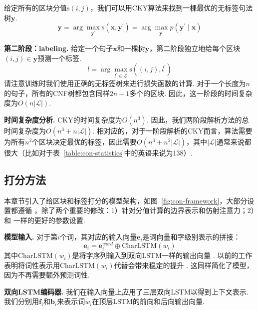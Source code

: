给定所有的区块分值$\mathrm{s}(i,j)$，我们可以用CKY算法来找到一棵最优的无标签句法树$\boldsymbol{y}$.
\begin{equation} \label{eq:tree-argmax}
  \boldsymbol{y} = \arg\max_{\boldsymbol{y}^{\prime}} \mathrm{s}(\boldsymbol{x}, \boldsymbol{y}^{\prime}) = \arg\max_{\boldsymbol{y}^{\prime}} p(\boldsymbol{y}^{\prime} \mid \boldsymbol{x})
\end{equation}

\noindent\textbf{第二阶段：labeling.}
给定一个句子$\boldsymbol{x}$和一棵树$\boldsymbol{y}$，第二阶段独立地给每个区块$(i,j) \in \boldsymbol{y}$预测一个标签.
\begin{equation} \label{eq:label-argmax}
  l = \arg\max_{l^{\prime} \in \mathcal{L}} \mathrm{s}((i,j),l^{\prime})
\end{equation}
请注意训练时我们使用正确的无标签树来进行损失函数的计算.
对于一个长度为$n$的句子，所有的CNF树都包含同样$2n-1$多个的区块.
因此，这一阶段的时间复杂度为$O(n|\mathcal{L}|)$.

\noindent\textbf{时间复杂度分析.}
CKY的时间复杂度为$O(n^3)$.
因此，我们两阶段解析方法的总时间复杂度为$O(n^3+n|\mathcal{L}|)$.
相对应的，对于一阶段解析的CKY而言，算法需要为所有$n^2$个区块决定最优的标签，因此需要$O(n^3+n^2|\mathcal{L}|)$，其中$|\mathcal{L}|$通常来说都很大（比如对于表~\ref{table:con-statistics}中的英语来说为138）.

\subsection{打分方法}

本章节引入了给区块和标签打分的模型架构，如图~\ref{fig:con-framework}，大部分设置都遵循 \citep{stern-etal-2017-minimal}，除了两个重要的修改：1）针对分值计算的边界表示和仿射注意力；2）和 \citep{dozat-etal-2017-biaffine}一样的更好的参数设置.

\noindent\textbf{模型输入.}
对于第$i$个词，其对应的输入向量$\mathbf{e}_i$是词向量和字级别表示的拼接：
\begin{equation} \label{eq:token-representation}
  \mathbf{e}_i = \mathbf{e}^{word}_i \oplus \mathrm{CharLSTM}(w_i)
\end{equation}
其中$\mathrm{CharLSTM}(w_i)$是将字序列输入到双向LSTM一样的输出向量 \citep{lample-etal-2016-neural}.
以前的工作表明将词性表示用$\mathrm{CharLSTM}(w_i)$代替会带来稳定的提升 \citep{kitaev-klein-2018-constituency}.
这同样简化了模型，因为不再需要额外预测词性.

\noindent\textbf{双向LSTM编码器.}
我们在输入向量上应用了三层双向LSTM以得到上下文表示.
我们分别用$\mathbf{f}_i$和$\mathbf{b}_i$来表示词$w_i$在顶层LSTM的前向和后向输出向量.

